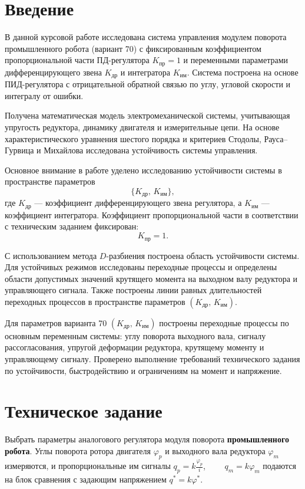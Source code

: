 \documentclass[a4paper, 14pt]{extarticle}
\begin{document}
\section*{Введение}

В данной курсовой работе исследована система управления модулем поворота промышленного робота (вариант 70) с фиксированным коэффициентом пропорциональной части ПД-регулятора \(K_{\text{пр}}=1\) и переменными параметрами дифференцирующего звена \(K_{\text{др}}\) и интегратора \(K_{\text{им}}\). Система построена на основе ПИД-регулятора с отрицательной обратной связью по углу, угловой скорости и интегралу от ошибки.

Получена математическая модель электромеханической системы, учитывающая упругость редуктора, динамику двигателя и измерительные цепи. На основе характеристического уравнения шестого порядка и критериев Стодолы, Рауса–Гурвица и Михайлова исследована устойчивость системы управления.

Основное внимание в работе уделено исследованию устойчивости системы в пространстве параметров
\[
    \{K_{\text{др}},\,K_{\text{им}}\},
\]
где \(K_{\text{др}}\) — коэффициент дифференцирующего звена регулятора,
а \(K_{\text{им}}\) — коэффициент интегратора. Коэффициент пропорциональной части в соответствии с техническим заданием фиксирован:
\[
    K_{\text{пр}}=1.
\]

С использованием метода \(D\)-разбиения построена область устойчивости системы. Для устойчивых режимов исследованы переходные процессы и определены области допустимых значений крутящего момента на выходном валу редуктора и управляющего сигнала. Также построены линии равных длительностей переходных процессов в пространстве параметров \((K_{\text{др}},\,K_{\text{им}})\).

Для параметров варианта 70 \((K_{\text{др}},\,K_{\text{им}})\) построены переходные процессы по основным переменным системы: углу поворота выходного вала, сигналу рассогласования, упругой деформации редуктора, крутящему моменту и управляющему сигналу. Проверено выполнение требований технического задания по устойчивости, быстродействию и ограничениям на момент и напряжение.
\newpage
\section*{Техническое задание}
Выбрать параметры аналогового регулятора модуля поворота \textbf{промышленного робота}. Углы поворота ротора двигателя $\varphi_p$ и выходного вала редуктора $\varphi_m$ измеряются, и пропорциональные им сигналы $q_p = k\frac{\varphi_p}{i}$, $\qquad q_m = k\varphi_m$ подаются на блок сравнения с задающим напряжением $q^* = k\varphi^*.$
\end{document}
